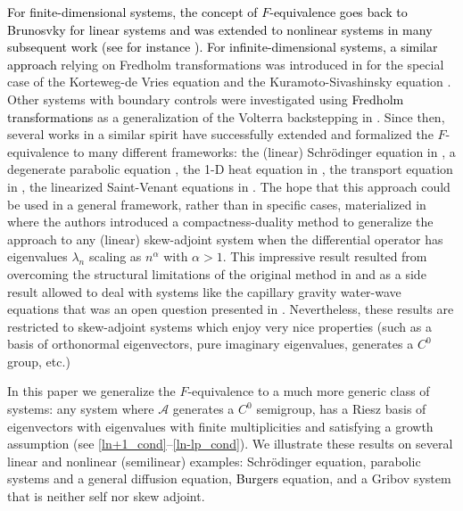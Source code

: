 \documentclass[11pt, dvipsnames]{amsart}
\begin{document}
\textcolor{black}{For finite-dimensional systems, the concept of $F$-equivalence goes back to Brunosvky \cite{brunovsky1970classification} for linear systems and was extended to nonlinear systems in many subsequent work (see for instance \cite{jakubczyk1993remarks,fliess1999lie,martin2001flat,cheng2005feedback}). For infinite-dimensional systems, a similar approach}
relying on Fredholm transformations was introduced 
in \cite{Coron2014-local} for the special case of the Korteweg-de Vries equation and the Kuramoto-Sivashinsky equation \cite{CoronLu15}. Other systems with boundary controls were investigated using \textcolor{black}{Fredholm transformations} as a generalization of the Volterra backstepping in \cite{coron2017finite,deutscher2019fredholm,redaud2022stabilizing}. Since then,
several works in a similar spirit have successfully extended and formalized the $F$-equivalence to many different frameworks: the (linear) Schrödinger equation in \cite{Coron2018-rapid}, a degenerate parabolic equation \cite{gagnon2021fredholm,lissy2023rapid}, the 1-D heat equation in \cite{Gagnon2022-fredholm-laplacien}, the transport equation in \cite{zhang2022internal}, the linearized Saint-Venant equations in \cite{Coron2022-stabilization}. The hope that this approach could be used in a general framework, rather than in specific cases, materialized in \cite{Gagnon2022-fredholm} where the authors introduced a compactness-duality method to generalize the approach to any (linear) skew-adjoint system when the differential operator has eigenvalues 
$\lambda_{n}$ scaling as $n^{\alpha}$ with $\alpha >1$. 
This impressive result resulted from overcoming the structural limitations of the original method in \cite{Coron2014-local} and as a side result allowed to deal with systems like the capillary gravity water-wave equations that was an open question presented in \cite{CoronCDF}. Nevertheless, these results are restricted to skew-adjoint systems which enjoy very nice properties (such as a basis of orthonormal eigenvectors, pure imaginary eigenvalues, generates a $C^{0}$ group, etc.)

In this paper we generalize the $F$-equivalence to a much more generic class of systems: 
any system where $\mathcal{A}$ generates a $C^{0}$ semigroup, has a Riesz basis of eigenvectors with eigenvalues with finite multiplicities and satisfying a growth assumption (see \eqref{ln+1_cond}--\eqref{ln-lp_cond}). 
We illustrate these results on several linear and nonlinear (semilinear) examples: Schrödinger equation, parabolic systems and a general diffusion equation, \textcolor{black}{Burgers} equation, and a Gribov system that is neither self nor skew adjoint.
\end{document}
